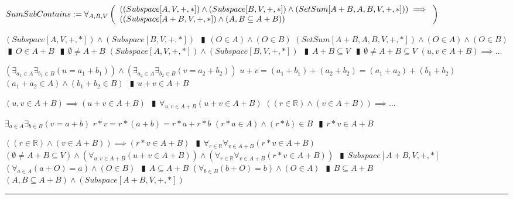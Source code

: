 \documentclass{book}
\newcommand{\abr}{:=}
\newcommand{\pipe}{$\phantom{(}\vrectangleblack\phantom{)}$}
\newcommand{\pr}[1]{\left(#1\right)}
\begin{document}
$SumSubContains \abr \forall_{A, B, V}\left(\begin{array}{ll}
  \pr{(Subspace[A, V, +, *]) \land (Subspace[B, V, +, *]) \land (SetSum[A + B, A, B, V, +, *])} \hfill \implies \hfill \\
  \pr{(Subspace[A + B, V, + ,*]) \land (A, B \subseteq A + B)}
\end{array}\right)$
\begin{enumerate}
  \lit $(Subspace[A, V, +, *]) \land (Subspace[B, V, +, *])$ \pipe $(O \in A) \land (O \in B)$
  \lit $(SetSum[A + B, A, B, V, +, *]) \land (O \in A) \land (O \in B)$ \pipe $O \in A + B$ \pipe $\emptyset \neq A + B$
  \lit $(Subspace[A, V, +, *]) \land (Subspace[B, V, +, *])$ \pipe $A + B \subseteq V$ \pipe $\emptyset \neq A + B \subseteq V$
  \lit $(u, v \in A + B) \implies \ldots$
  \begin{enumerate}
    \lit $\pr{\exists_{a_1 \in A} \exists_{b_1 \in B}(u = a_1 + b_1)} \land \pr{\exists_{a_2 \in A} \exists_{b_2 \in B}(v = a_2 + b_2)}$
    \lit $u + v = (a_1 + b_1) + (a_2 + b_2) = (a_1 + a_2) + (b_1 + b_2)$
    \lit $(a_1 + a_2 \in A) \land (b_1 + b_2 \in B)$ \pipe $u + v \in A + B$
  \end{enumerate}
  \lit $(u, v \in A + B) \implies (u + v \in A + B)$ \pipe $\forall_{u, v \in A + B}(u + v \in A + B)$
  \lit $\pr{(r \in \mathbb{R}) \land (v \in A + B)} \implies \ldots$
  \begin{enumerate}
    \lit $\exists_{a \in A} \exists_{b \in B}(v = a + b)$
    \lit $r * v = r * (a + b) = r * a + r * b$
    \lit $(r * a \in A) \land (r * b) \in B$ \pipe $r * v \in A + B$
  \end{enumerate}
  \lit $\pr{(r \in \mathbb{R}) \land (v \in A + B)} \implies (r * v \in A + B)$ \pipe $\forall_{r \in \mathbb{R}} \forall_{v \in A + B}(r * v \in A + B)$
  \lit $(\emptyset \neq A + B \subseteq V) \land \pr{\forall_{u, v \in A + B}(u + v \in A + B)} \land \pr{\forall_{r \in \mathbb{R}} \forall_{v \in A + B}(r * v \in A + B)}$ \pipe $Subspace[A + B, V, + ,*]$
  \lit $\pr{\forall_{a \in A}(a + O) = a} \land (O \in B)$ \pipe $A \subseteq A + B$
  \lit $\pr{\forall_{b \in B}(b + O) = b} \land (O \in A)$ \pipe $B \subseteq A + B$
  \lit $(A, B \subseteq A + B) \land (Subspace[A + B, V, + ,*])$
\end{enumerate} \vspace{.75mm} \hrule \vspace{.75mm} \ \\
\end{document}
